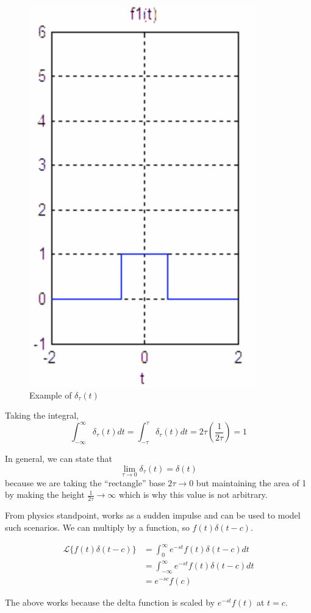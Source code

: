 \begin{figure}[H]
    \centering
    \includegraphics[scale=0.5]{figures/dirac-example.png}
    \caption{Example of $\delta_\tau(t)$}
\end{figure}

Taking the integral,
\begin{equation*}
    \int_{-\infty}^\infty \delta_\tau(t)dt=\int_{-\tau}^\tau \delta_\tau(t)dt=2\tau\left(\frac{1}{2\tau}\right)=1
\end{equation*}

In general, we can state that
\begin{equation*}
    \lim_{\tau\to 0}\delta_\tau(t)=\delta(t)
\end{equation*}
because we are taking the ``rectangle'' base $2\tau\to 0$ but maintaining the area of 1 by making the height $\frac{1}{2\tau}\to \infty$ which is why this value is not arbitrary.

From physics standpoint, works as a sudden impulse and can be used to model such scenarios.
We can multiply by a function, so $f(t)\delta(t-c)$.

\begin{align*}
    \mathcal{L}\{f(t)\delta(t-c)\}&=\int_0^\infty e^{-st}f(t)\delta(t-c)dt\\
    &=\int_{-\infty}^{\infty} e^{-st}f(t)\delta(t-c)dt\\
    &=e^{-sc}f(c)
\end{align*}

The above works because the delta function is scaled by $e^{-st}f(t)$ at $t=c$.